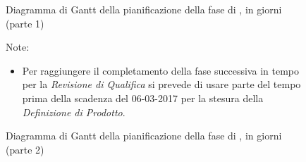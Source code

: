 \begin{figure}[H]
\label{tab:ganttpa1}
\caption{Diagramma di Gantt della pianificazione della fase di \PA, in giorni (parte 1)}
\end{figure}

\begin{figure}[H]
\label{tab:ganttpa2}
\caption{Diagramma di Gantt della pianificazione della fase di \PA, in giorni (parte 2)}

Note:
\begin{itemize}
	\item Per raggiungere il completamento della fase successiva in tempo per la \emph{Revisione di Qualifica} si prevede di usare parte del tempo prima della scadenza del 06-03-2017 per la stesura della \emph{Definizione di Prodotto}.
\end{itemize} 
\end{figure}


